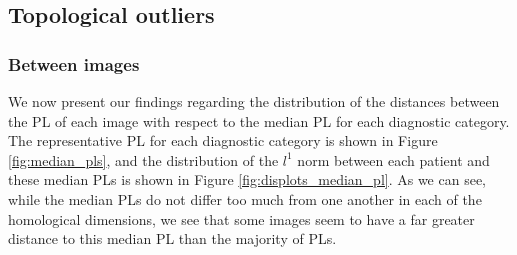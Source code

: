 \documentclass{article}
\begin{document}
\subsection{Topological outliers}

\subsubsection{Between images}

We now present our findings regarding the distribution of the distances between the PL of each image with respect to the median PL for each diagnostic category. The representative PL for each diagnostic category is shown in Figure \ref{fig:median_pls}, and the distribution of the $l^1$ norm between each patient and these median PLs is shown in Figure \ref{fig:displots_median_pl}. As we can see, while the median PLs do not differ too much from one another in each of the homological dimensions, we see that some images seem to have a far greater distance to this median PL than the majority of PLs.
\end{document}
